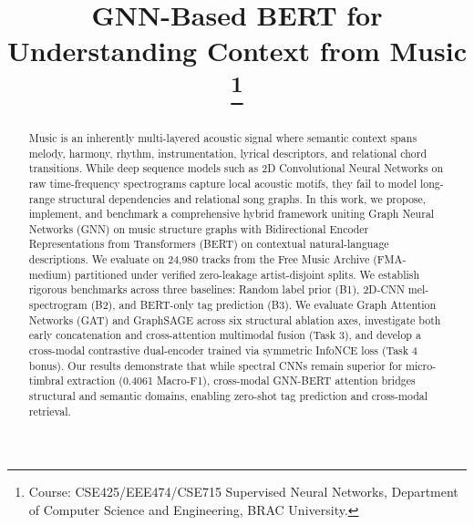 \documentclass[conference]{IEEEtran}
\begin{document}
\title{GNN-Based BERT for Understanding Context from Music\\
\thanks{Course: CSE425/EEE474/CSE715 Supervised Neural Networks, Department of Computer Science and Engineering, BRAC University.}
}

\author{
\and
{}
\and
{}
\and
{}
}

\maketitle

\begin{abstract}
Music is an inherently multi-layered acoustic signal where semantic context spans melody, harmony, rhythm, instrumentation, lyrical descriptors, and relational chord transitions. While deep sequence models such as 2D Convolutional Neural Networks on raw time-frequency spectrograms capture local acoustic motifs, they fail to model long-range structural dependencies and relational song graphs. In this work, we propose, implement, and benchmark a comprehensive hybrid framework uniting Graph Neural Networks (GNN) on music structure graphs with Bidirectional Encoder Representations from Transformers (BERT) on contextual natural-language descriptions. We evaluate on 24,980 tracks from the Free Music Archive (FMA-medium) partitioned under verified zero-leakage artist-disjoint splits. We establish rigorous benchmarks across three baselines: Random label prior (B1), 2D-CNN mel-spectrogram (B2), and BERT-only tag prediction (B3). We evaluate Graph Attention Networks (GAT) and GraphSAGE across six structural ablation axes, investigate both early concatenation and cross-attention multimodal fusion (Task 3), and develop a cross-modal contrastive dual-encoder trained via symmetric InfoNCE loss (Task 4 bonus). Our results demonstrate that while spectral CNNs remain superior for micro-timbral extraction (0.4061 Macro-F1), cross-modal GNN-BERT attention bridges structural and semantic domains, enabling zero-shot tag prediction and cross-modal retrieval.
\end{abstract}
\end{document}
